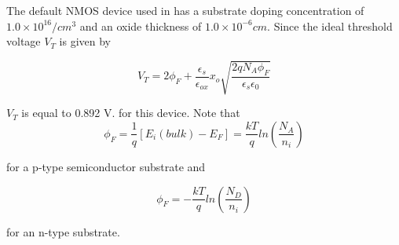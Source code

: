 The default NMOS device used in \Xyce{} has a substrate doping
concentration of $1.0 \times 10^{16}/cm^{3}$ and an oxide thickness of $1.0
\times 10^{-6}cm$.  Since the ideal threshold voltage $V_{T}$ is given by

\begin{equation}
  V_{T} = 2 \phi_{F} + \frac{\epsilon_{s}}{\epsilon_{ox}} x_{o} 
\sqrt{\frac{2qN_{A}\phi_{F}}{\epsilon_{s}\epsilon_{0}}}
\end{equation}

$V_{T}$ is equal to 0.892 V. for this device.  Note that 
\begin{equation}
  \phi_{F} = \frac{1}{q}[E_{i}(bulk) - E_{F}] = \frac{kT}{q}
  ln(\frac{N_{A}}{n_{i}})
\end{equation}

for a p-type semiconductor substrate and

\begin{equation}
 \phi_{F} = - \frac{kT}{q} ln(\frac{N_{D}}{n_{i}})
\end{equation}

for an n-type substrate.



